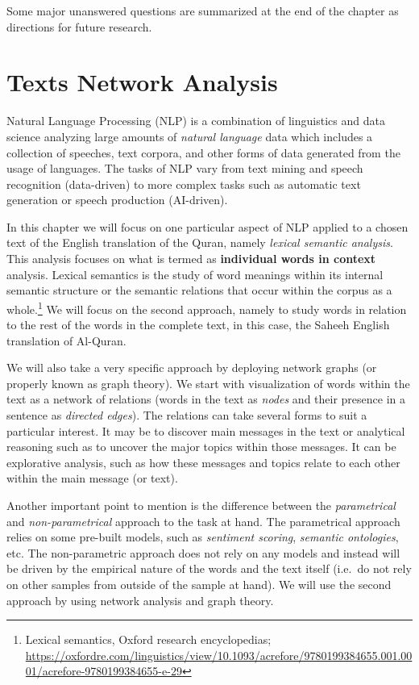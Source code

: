 \documentclass[
]{article}
\begin{document}
Some major unanswered questions are summarized at the end of the chapter as directions for future research.

\hypertarget{text-network-analysis}{%
\section{Texts Network Analysis}\label{text-network-analysis}}

Natural Language Processing (NLP) is a combination of linguistics and data science analyzing large amounts of \emph{natural language} data which includes a collection of speeches, text corpora, and other forms of data generated from the usage of languages. The tasks of NLP vary from text mining and speech recognition (data-driven) to more complex tasks such as automatic text generation or speech production (AI-driven).

In this chapter we will focus on one particular aspect of NLP applied to a chosen text of the English translation of the Quran, namely \emph{lexical semantic analysis}. This analysis focuses on what is termed as \textbf{individual words in context} analysis. Lexical semantics is the study of word meanings within its internal semantic structure or the semantic relations that occur within the corpus as a whole.\footnote{Lexical semantics, Oxford research encyclopedias; \url{https://oxfordre.com/linguistics/view/10.1093/acrefore/9780199384655.001.0001/acrefore-9780199384655-e-29}} We will focus on the second approach, namely to study words in relation to the rest of the words in the complete text, in this case, the Saheeh English translation of Al-Quran.

We will also take a very specific approach by deploying network graphs (or properly known as graph theory). We start with visualization of words within the text as a network of relations (words in the text as \emph{nodes} and their presence in a sentence as \emph{directed edges}). The relations can take several forms to suit a particular interest. It may be to discover main messages in the text or analytical reasoning such as to uncover the major topics within those messages. It can be explorative analysis, such as how these messages and topics relate to each other within the main message (or text).

Another important point to mention is the difference between the \emph{parametrical} and \emph{non-parametrical} approach to the task at hand. The parametrical approach relies on some pre-built models, such as \emph{sentiment scoring}, \emph{semantic ontologies}, etc. The non-parametric approach does not rely on any models and instead will be driven by the empirical nature of the words and the text itself (i.e.~do not rely on other samples from outside of the sample at hand). We will use the second approach by using network analysis and graph theory.
\end{document}
